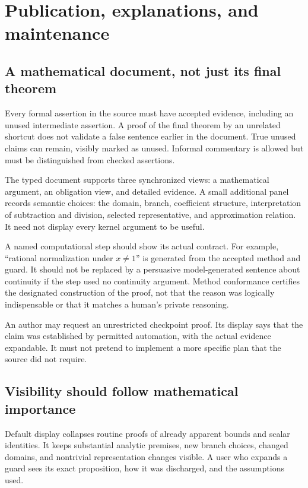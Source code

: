 \documentclass[11pt,a4paper]{article}
\theoremstyle{remark}\newtheorem{example}[proposition]{Example}
\begin{document}
\section{Publication, explanations, and maintenance}\label{sec:publication}
\subsection{A mathematical document, not just its final theorem}
Every formal assertion in the source must have accepted evidence, including an unused intermediate assertion. A proof of the final theorem by an unrelated shortcut does not validate a false sentence earlier in the document. True unused claims can remain, visibly marked as unused. Informal commentary is allowed but must be distinguished from checked assertions.

The typed document supports three synchronized views: a mathematical argument, an obligation view, and detailed evidence. A small additional panel records semantic choices: the domain, branch, coefficient structure, interpretation of subtraction and division, selected representative, and approximation relation. It need not display every kernel argument to be useful.

A named computational step should show its actual contract. For example, ``rational normalization under $x\ne1$'' is generated from the accepted method and guard. It should not be replaced by a persuasive model-generated sentence about continuity if the step used no continuity argument. Method conformance certifies the designated construction of the proof, not that the reason was logically indispensable or that it matches a human's private reasoning.

An author may request an unrestricted checkpoint proof. Its display says that the claim was established by permitted automation, with the actual evidence expandable. It must not pretend to implement a more specific plan that the source did not require.

\subsection{Visibility should follow mathematical importance}
Default display collapses routine proofs of already apparent bounds and scalar identities. It keeps substantial analytic premises, new branch choices, changed domains, and nontrivial representation changes visible. A user who expands a guard sees its exact proposition, how it was discharged, and the assumptions used.
\end{document}
